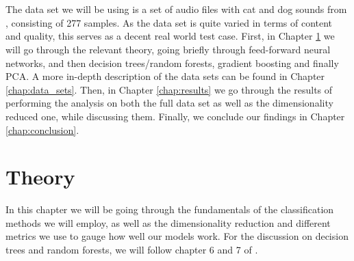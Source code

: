 \documentclass[a4paper]{article}
\newcommand\red[1]{\textcolor{red}{\textbf{#1}}}
\begin{document}
%
\\\\
The data set we will be using is a set of audio files with cat and dog sounds from \cite{Kaggle_catdog}, consisting of 277 samples. As the data set is quite varied in terms of content and quality, this serves as a decent real world test case.
First, in Chapter \ref{chap:theory} we will go through the relevant theory, going briefly  through feed-forward neural networks, and then decision trees/random forests, gradient boosting and finally PCA. A more in-depth description of the data sets can be found in Chapter \ref{chap:data_sets}. Then, in Chapter \ref{chap:results} we go through the results of performing the analysis on both the full data set as well as the dimensionality reduced one, while discussing them. Finally, we conclude our findings in Chapter \ref{chap:conclusion}.


\section{Theory} \label{chap:theory}
In this chapter we will be going through the fundamentals of the classification methods we will employ, as well as the dimensionality reduction and different metrics we use to gauge how well our models work. For the discussion on decision trees and random forests, we will follow chapter 6 and 7 of \cite{Geron}.
\end{document}
